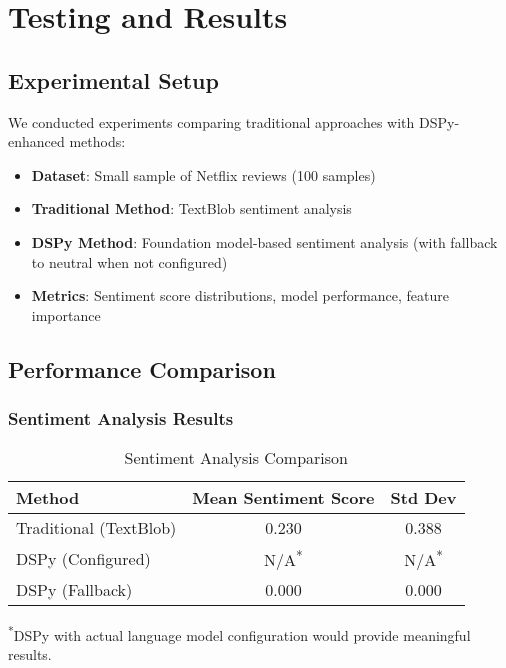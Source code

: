 \documentclass[11pt]{article}
\begin{document}
\section{Testing and Results}

\subsection{Experimental Setup}

We conducted experiments comparing traditional approaches with DSPy-enhanced methods:

\begin{itemize}
    \item \textbf{Dataset}: Small sample of Netflix reviews (100 samples)
    \item \textbf{Traditional Method}: TextBlob sentiment analysis
    \item \textbf{DSPy Method}: Foundation model-based sentiment analysis (with fallback to neutral when not configured)
    \item \textbf{Metrics}: Sentiment score distributions, model performance, feature importance
\end{itemize}

\subsection{Performance Comparison}

\subsubsection{Sentiment Analysis Results}

\begin{table}[h]
\centering
\begin{tabular}{lcc}
\toprule
\textbf{Method} & \textbf{Mean Sentiment Score} & \textbf{Std Dev} \\
\midrule
Traditional (TextBlob) & 0.230 & 0.388 \\
DSPy (Configured) & N/A\textsuperscript{*} & N/A\textsuperscript{*} \\
DSPy (Fallback) & 0.000 & 0.000 \\
\bottomrule
\end{tabular}
\caption{Sentiment Analysis Comparison}
\end{table}

\textsuperscript{*}DSPy with actual language model configuration would provide meaningful results.
\end{document}
